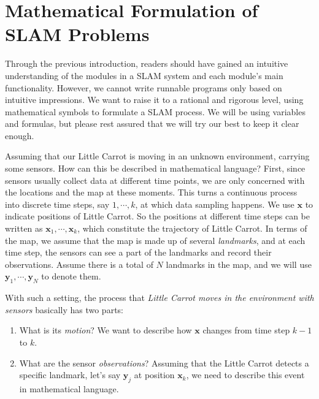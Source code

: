 \section{Mathematical Formulation of SLAM Problems}
Through the previous introduction, readers should have gained an intuitive understanding of the modules in a SLAM system and each module's main functionality. However, we cannot write runnable programs only based on intuitive impressions. We want to raise it to a rational and rigorous level, using mathematical symbols to formulate a SLAM process. We will be using variables and formulas, but please rest assured that we will try our best to keep it clear enough.

Assuming that our Little Carrot is moving in an unknown environment, carrying some sensors. How can this be described in mathematical language? First, since sensors usually collect data at different time points, we are only concerned with the locations and the map at these moments. This turns a continuous process into discrete time steps, say $1, \cdots, k$, at which data sampling happens. We use $\mathbf{x}$ to indicate positions of Little Carrot. So the positions at different time steps can be written as $\mathbf{x}_1,\cdots,\mathbf{x}_k$, which constitute the trajectory of Little Carrot. In terms of the map, we assume that the map is made up of several \emph{landmarks}, and at each time step, the sensors can see a part of the landmarks and record their observations. Assume there is a total of $N$ landmarks in the map, and we will use $\mathbf{y}_1, \cdots, \mathbf{y}_N$ to denote them.

With such a setting, the process that \textit{Little Carrot moves in the environment with sensors} basically has two parts: 

\begin{enumerate}
\item What is its \emph{motion}? We want to describe how $\mathbf{x}$ changes from time step $k-1$ to $k$.
\item What are the sensor \emph{observations}? Assuming that the Little Carrot detects a specific landmark, let's say $\mathbf{y}_j$ at position $\mathbf{x}_k$, we need to describe this event in mathematical language.
\end{enumerate}

